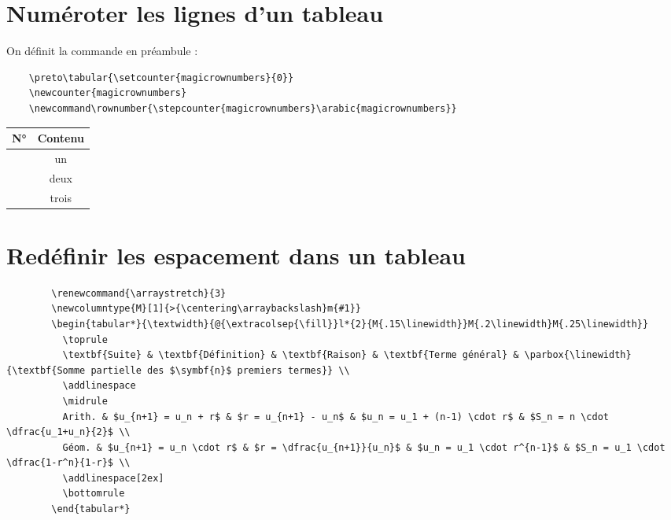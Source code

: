 \section{Numéroter les lignes d'un tableau}

On définit la commande \inlatex{\rownumber} en préambule : 

\begin{verbatim}
	\preto\tabular{\setcounter{magicrownumbers}{0}}
	\newcounter{magicrownumbers}
	\newcommand\rownumber{\stepcounter{magicrownumbers}\arabic{magicrownumbers}}
\end{verbatim}

\begin{LTXexample}
\begin{tabular}{|l|c|}
	N° & Contenu \\
	\hline
	\rownumber & un \\
	\rownumber & deux \\
	\rownumber & trois
\end{tabular}
\end{LTXexample}





\section{Redéfinir les espacement dans un tableau}

\begin{minipage}{.9\linewidth}
	\begin{verbatim}
        \renewcommand{\arraystretch}{3}
        \newcolumntype{M}[1]{>{\centering\arraybackslash}m{#1}}
        \begin{tabular*}{\textwidth}{@{\extracolsep{\fill}}l*{2}{M{.15\linewidth}}M{.2\linewidth}M{.25\linewidth}}
          \toprule
          \textbf{Suite} & \textbf{Définition} & \textbf{Raison} & \textbf{Terme général} & \parbox{\linewidth}{\textbf{Somme partielle des $\symbf{n}$ premiers termes}} \\
          \addlinespace
          \midrule
          Arith. & $u_{n+1} = u_n + r$ & $r = u_{n+1} - u_n$ & $u_n = u_1 + (n-1) \cdot r$ & $S_n = n \cdot \dfrac{u_1+u_n}{2}$ \\
          Géom. & $u_{n+1} = u_n \cdot r$ & $r = \dfrac{u_{n+1}}{u_n}$ & $u_n = u_1 \cdot r^{n-1}$ & $S_n = u_1 \cdot \dfrac{1-r^n}{1-r}$ \\
          \addlinespace[2ex]
          \bottomrule
        \end{tabular*}
	\end{verbatim}
\end{minipage}

